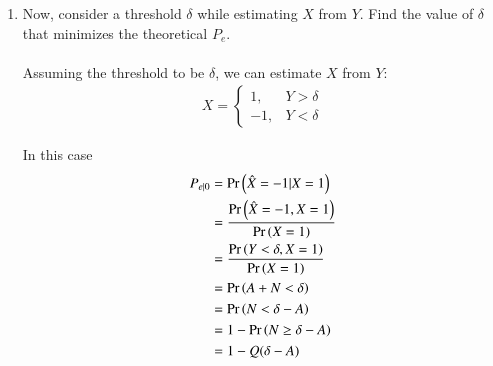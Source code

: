 \documentclass[journal,12pt,twocolumn]{IEEEtran}
\renewcommand\thesection{\arabic{section}}
\begin{document}
\begin{enumerate}[label=\thesection.\arabic*
,ref=\thesection.\theenumi]
	Similarly, we can write
	\begin{align}
		P_{e|1} &= \pr{\hat{X} = 1|X = -1} \\
		&= \frac{\pr{\hat{X} = 1, X = -1}}{\pr{X = -1}} \\
		&= \frac{\pr{Y > 0, X = -1}}{\pr{X = -1}} \\
		&= \pr{-A + N > 0} \\
		&= \pr{N > A} \\
		&= Q(A)
		\label{eq:PE1}
	\end{align}
	
	Hence, we can determine $P_e$ as follows:
	\begin{align}
		P_e &= P_{e|0} \pr{X = 1} + P_{e|1} \pr{X = -1} \\
		&= \frac{1}{2}\left( Q(A) + 1 - Q(-A) \right) \\
		&= \frac{1}{2}\left( 2Q(A) \right) \\
		&= Q(A)
		\label{eq:PE}
	\end{align}

	Note that $\pr{X = 1} = \pr{X = -1} = \frac{1}{2}$ and $Q(A) + Q(-A) = 1$.
	
	We first generate statistically, various values of $P_e$ for different values of $a$. We execute the following code to generate sample:
	\begin{lstlisting}
gcc exrand.c -lm
./a.out
	\end{lstlisting}
	The samples are now generated in \verb|pe_a.dat|.
	
	To observe the theoretical plot and the statistical values of $P_e$ vs $a$, we execute the following code:
	\begin{lstlisting}
python3 pea_graph.py
	\end{lstlisting}
	
\item Now, consider a threshold $\delta$ while estimating $X$ from $Y$. Find the value of $\delta$ that minimizes the theoretical $P_e$.
	\\
	\solution
	\\
	Assuming the threshold to be $\delta$, we can estimate $X$ from $Y$:
	\begin{align}
		X =
		\begin{cases}
			1, & Y > \delta \\
			-1, & Y < \delta
		\end{cases}
		\label{eq: Estimate}
	\end{align}
	
	In this case
	\begin{align}
		P_{e|0} &= \Pr\left(\hat{X} = -1|X = 1\right) \\
		&= \frac{\Pr\left(\hat{X} = -1, X = 1\right)}{\Pr\left(X = 1\right)} \\
		&= \frac{\Pr\left(Y < \delta, X = 1\right)}{\Pr\left(X = 1\right)} \\
		&= \Pr\left(A + N < \delta\right) \\
		&= \Pr\left(N < \delta - A\right) \\
		&= 1 - \Pr\left(N \geq \delta - A\right)\\
		&= 1 - Q(\delta - A)
		\label{eq:PE0Delta}
	\end{align}
	

\end{enumerate}
\end{document}
